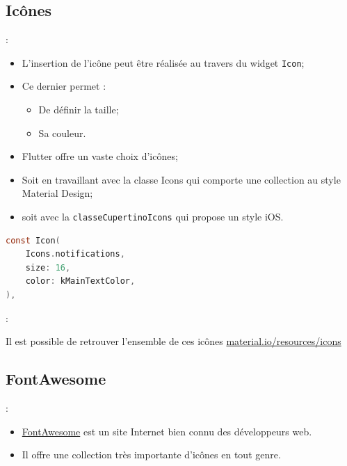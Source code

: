 \documentclass[10pt]{beamer}
\begin{document}
\subsection{Icônes}
\begin{frame}[fragile]{\secname : \subsecname}
    \begin{itemize}
        \item L’insertion de l’icône peut être réalisée au travers du widget \lstinline[language=sql]!Icon!;
        \item Ce dernier permet :
              \begin{itemize}
                  \item De définir la taille;
                  \item Sa couleur.
              \end{itemize}
        \item Flutter offre un vaste choix d’icônes;
        \item Soit en travaillant avec la classe Icons qui comporte une collection au style Material Design;
        \item soit avec la \lstinline[language=sql]!classeCupertinoIcons! qui propose un style iOS.

    \end{itemize}
    \begin{lstlisting}[language=C]
const Icon(
    Icons.notifications,
    size: 16,
    color: kMainTextColor,
),
        \end{lstlisting}
\end{frame}

\begin{frame}[fragile]{\secname : \subsecname}
    \begin{center}
        Il est possible de retrouver l’ensemble de ces icônes \linebreak
        \href{https://material.io/resources/icons/?style=baseline}{material.io/resources/icons}
    \end{center}
\end{frame}
\subsection{FontAwesome}
\begin{frame}[fragile]{\secname : \subsecname}
    \begin{itemize}
        \item \href{https://fontawesome.com}{FontAwesome} est un site Internet bien connu des développeurs web.
        \item Il offre une collection très importante d’icônes en tout genre.
    \end{itemize}
\end{frame}
\end{document}
